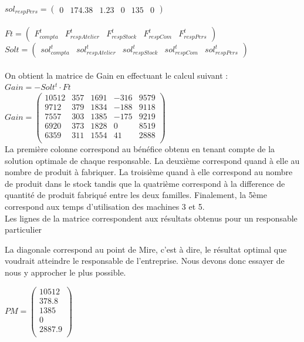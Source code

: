 \documentclass[a4paper, 11pt]{article}
\begin{document}
$sol_{respPers} = \begin{pmatrix}0 &174.38 &1.23 &0 &135 &0 \end{pmatrix} $ \\\\
$Ft = \begin{pmatrix} F_{compta}^t &F_{respAtelier}^t &F_{respStock}^t &F_{respCom}^t &F_{respPers}^t \end{pmatrix} $\\
$Solt = \begin{pmatrix} sol_{compta}^t &sol_{respAtelier}^t &sol_{respStock}^t &sol_{respCom}^t &sol_{respPers}^t \end{pmatrix} $ \\\\
On obtient la matrice de Gain en effectuant le calcul suivant : \\
$Gain = -Solt^t \cdot Ft $ \\

$ Gain=\begin{pmatrix}
10512 &357 &1691 &-316 &9579\\
9712 &379 &1834 &-188 &9118\\
7557 &303 &1385 &-175 &9219\\
6920 &373 &1828 &0 &8519\\
6359 &311 &1554 &41 &2888\\
\end{pmatrix} $\\


La première colonne correspond au bénéfice obtenu en tenant compte de la solution optimale de chaque responsable.
La deuxième correspond quand à elle au nombre de produit à fabriquer.
La troisième quand à elle correspond au nombre de produit dans le stock tandis que la quatrième correspond à la difference de quantité de produit fabriqué entre les deux familles.
Finalement, la 5ème correspond aux temps d’utilisation des machines 3 et 5.\\
Les lignes de la matrice correspondent aux résultats obtenus pour un responsable particulier

La diagonale correspond au point de Mire, c’est à dire, le résultat optimal que voudrait atteindre le responsable de l’entreprise. Nous devons donc essayer de nous y approcher le plus possible.

$ PM = \begin{pmatrix}
10512\\
378.8\\
1385\\
0\\
2887.9\\
\end{pmatrix} $
\end{document}
